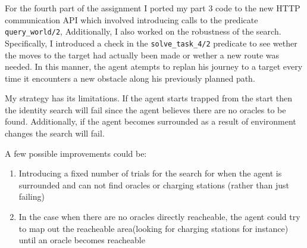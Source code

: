 \documentclass{article}
\begin{document}
        For the fourth part of the assignment I ported my part 3 code to the new HTTP
    communication API which involved introducing calls to the predicate \verb|query_world/2|, 
    Additionally, I also worked on the robustness of the search. Specifically,
    I introduced a check in the \verb|solve_task_4/2| predicate to see wether the 
    moves to the target had actually been made or wether a new route was needed.
    In this manner, the agent atempts to replan his journey to a target every time
    it encounters a new obstacle along his previously planned path.

    \indent My strategy has its limitations. If the agent starts trapped
    from the start then the identity search will fail since the agent believes there 
    are no oracles to be found. Additionally, if the agent becomes surrounded as a result of environment
    changes the search will fail.

    \indent A few possible improvements could be:
    \begin{enumerate}
        \item Introducing a fixed number of trials for the search for when the agent is surrounded and can not find oracles or charging stations (rather than just failing)
        \item In the case when there are no oracles directly reacheable, the agent could try to map out the reacheable area(looking for charging stations for instance) until an oracle becomes reacheable
    \end{enumerate}
\end{document}

